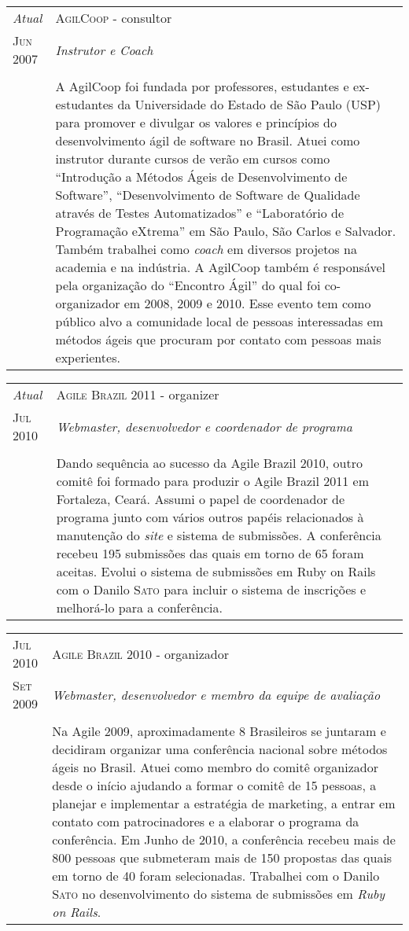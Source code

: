 \documentclass[letter,10pt]{article}
\begin{document}
\begin{tabular}{p{2.5cm}|p{13.5cm}}
  \emph{Atual} & \textsc{AgilCoop} - consultor\\
  \textsc{Jun 2007}& \emph{Instrutor e Coach}\\
  &\\
  &A AgilCoop foi fundada por professores, estudantes e ex-estudantes
  da Universidade do Estado de São Paulo (USP) para promover e
  divulgar os valores e princípios do desenvolvimento ágil de software
  no Brasil. Atuei como instrutor durante cursos de verão em cursos
  como ``Introdução a Métodos Ágeis de Desenvolvimento de Software'',
  ``Desenvolvimento de Software de Qualidade através de Testes
  Automatizados'' e ``Laboratório de Programação eXtrema'' em São
  Paulo, São Carlos e Salvador.
  Também trabalhei como \textit{coach} em diversos projetos na
  academia e na indústria. A AgilCoop também é responsável pela
  organização do ``Encontro Ágil'' do qual foi co-organizador em 2008,
  2009 e 2010. Esse evento tem como público alvo a comunidade local de
  pessoas interessadas em métodos ágeis que procuram por contato com
  pessoas mais experientes.
\end{tabular}

\begin{tabular}{p{2.5cm}|p{13.5cm}}
  \emph{Atual} & \textsc{Agile Brazil 2011} - organizer\\
  \textsc{Jul 2010}& \emph{Webmaster, desenvolvedor e  coordenador de programa}\\
  &\\
  & Dando sequência ao sucesso da Agile Brazil 2010, outro comitê foi
  formado para produzir o Agile Brazil 2011 em Fortaleza,
  Ceará. Assumi o papel de coordenador de programa junto com vários
  outros papéis relacionados à manutenção do \textit{site} e sistema
  de submissões. A conferência recebeu 195 submissões das quais em
  torno de
  65 foram aceitas. Evolui o sistema de submissões em Ruby on Rails
  com o Danilo \textsc{Sato} para incluir o sistema de inscrições e
  melhorá-lo para a conferência.
\end{tabular}

\begin{tabular}{p{2.5cm}|p{13.5cm}}
  \textsc{Jul 2010} & \textsc{Agile Brazil 2010} - organizador\\
  \textsc{Set 2009}& \emph{Webmaster, desenvolvedor e membro da equipe
    de avaliação}\\
  &\\
  &Na Agile 2009, aproximadamente 8 Brasileiros se juntaram e
  decidiram organizar uma conferência nacional sobre métodos ágeis no
  Brasil. Atuei como membro do comitê organizador desde o início
  ajudando a formar o comitê de 15 pessoas, a planejar e implementar a
  estratégia de marketing, a entrar em contato com patrocinadores e a
  elaborar o programa da conferência.
 Em Junho de 2010, a conferência
  recebeu mais de 800 pessoas que submeteram mais de 150 propostas das
  quais em torno de 40 foram selecionadas. Trabalhei com o Danilo
  \textsc{Sato} no desenvolvimento do sistema de submissões em
  \textit{Ruby on Rails}.
\end{tabular}
\end{document}
